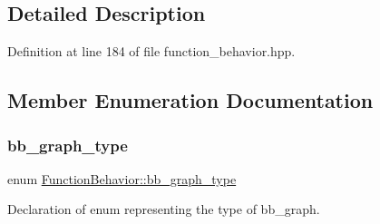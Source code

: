 \subsection{Detailed Description}


Definition at line 184 of file function\+\_\+behavior.\+hpp.



\subsection{Member Enumeration Documentation}
\mbox{\label{classFunctionBehavior_a4e23c056fc0e7e2f677d6e51fcf1fbae}} 
\subsubsection{\texorpdfstring{bb\+\_\+graph\+\_\+type}{bb\_graph\_type}}
{\footnotesize\ttfamily enum \hyperlink{classFunctionBehavior_a4e23c056fc0e7e2f677d6e51fcf1fbae}{Function\+Behavior\+::bb\+\_\+graph\+\_\+type}}



Declaration of enum representing the type of bb\+\_\+graph. 

